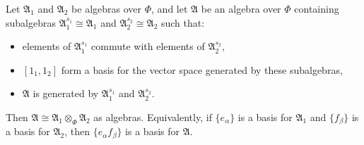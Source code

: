Let $\mathfrak{A}_1$ and $\mathfrak{A}_2$ be algebras over $\Phi$, and let $\mathfrak{A}$ be an algebra over $\Phi$ containing subalgebras $\mathfrak{A}_1^{s_1} \cong \mathfrak{A}_1$ and $\mathfrak{A}_2^{s_2} \cong \mathfrak{A}_2$ such that:
\begin{itemize}
\item[(i)] elements of $\mathfrak{A}_1^{s_1}$ commute with elements of $\mathfrak{A}_2^{s_2}$,
\item[(ii)] $[1_1, 1_2]$ form a basis for the vector space generated by these subalgebras,
\item[(iii)] $\mathfrak{A}$ is generated by $\mathfrak{A}_1^{s_1}$ and $\mathfrak{A}_2^{s_2}$.
\end{itemize}
Then $\mathfrak{A} \cong \mathfrak{A}_1 \otimes_\Phi \mathfrak{A}_2$ as algebras. Equivalently, if $\{e_\alpha\}$ is a basis for $\mathfrak{A}_1$ and $\{f_\beta\}$ is a basis for $\mathfrak{A}_2$, then $\{e_\alpha f_\beta\}$ is a basis for $\mathfrak{A}$.
